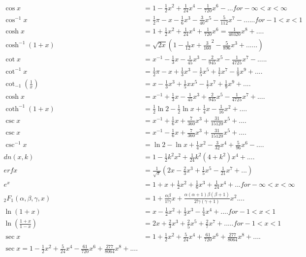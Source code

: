 		\begin{align}
		\cos x &= 1- \frac{1}{2}x^{2}+\frac{1}{24}x^{4}-\frac{1}{720}x^{6} - \ldots for -\infty < x < \infty	\\
		\cos^{-1} x &= \frac{1}{2} \pi - x - \frac{1}{6} x^{3} - \frac{3}{40} x^{5} - \frac{5}{112} x^{7} - ......for - 1 < x < 1\\
		\cosh x &= 1 + \frac{1}{2} x^2  + \frac{1}{24} x^4 + \frac{1}{720} x^6 = \frac{1}{40320} x^8 + ....\\	
		\cosh^{-1} (1+x) &= \sqrt{2x} (1 - \frac{1}{12} x + \frac{3}{160} ^2 - \frac{5}{896} x^3 + ......) \\
		\cot x &= x^{-1} - \frac{1}{3} x - \frac{1}{45} x^3 - \frac{2}{945} x^5 - \frac{1}{4725} x^7 - .....\\
		\cot^{-1} x &= \frac{1}{2} \pi - x + \frac{1}{3} x^3 - \frac{1}{5} x^5 + \frac{1}{7} x^7 - \frac{1}{9} x^9 + ....\\	
		\cot_{-1}(\frac{1}{x}) &= x - \frac{1}{3} x^3 + \frac{1}{5} x x^5 - \frac{1}{7} x^7 + \frac{1}{9} x^9 + ....\\
		\cosh x &= x^{-1} + \frac{1}{3} x - \frac{1}{45} x^3 + \frac{2}{945} x^5 - \frac{1}{4725} x^7 + ....\\
		\coth^{-1}(1+x) &= \frac{1}{2} \ln 2 - \frac{1}{2} \ln x + \frac{1}{4} x - \frac{1}{16} x^2 + ....\\
		\csc x &= x^{-1} + \frac{1}{6} x + \frac{7}{360} x^3 + \frac{31}{15120} x^5 + ....\\
		\csc x &= x^{-1} - \frac{1}{6} x + \frac{7}{360} x^3 + \frac{31}{15120} x^5 + ....\\
		\csc^{-1} x &= \ln 2 - \ln x + \frac{1}{4} x^2 - \frac{3}{32} x^4 + \frac{5}{96} x^6 - ....\\
		dn(x,k) &= 1 - \frac{1}{2} k^2 x^2 + \frac{1}{24} k^2 (4+k^2) x^4 + ....\\
		erf x &= \frac{1}{\sqrt{\pi}} (2x - \frac{2}{3} x^3 + \frac{1}{5} x^5 - \frac{1}{21}x^7 + ...) \\
		e^x &= 1 + x + \frac{1}{2} x^2 + \frac{1}{6} x^3 + \frac{1}{24} x^4 + ... for - \infty < x < \infty \\
		_{2}F_{1} (\alpha,\beta,\gamma,x) &= 1 + \frac{\alpha\beta}{1!\gamma} x + \frac{\alpha(\alpha + 1)\beta(\beta + 1)}{2!\gamma(\gamma + 1)} x^2 ....\\
		\ln(1 + x) &= x - \frac{1}{2} x^2 + \frac{1}{3} x^3 - \frac{1}{4} x^4 + ....for -1 < x < 1 \\
		\ln (\frac{1+x}{1-x}) &= 2x + \frac{2}{3} x^3 + \frac{2}{5} x^5 + \frac{2}{7} x^7 + ..... for -1 < x < 1 \\
		\sec x &= 1 + \frac{1}{2} x^2 + \frac{5}{24} x^4 + \frac{61}{720} x^6 + \frac{277}{8064} x^8 + ....\\
		\sec x = 1 - \frac{1}{2} x^2 + \frac{5}{24} x^4 - \frac{61}{720} x^6 + \frac{277}{8064} x^8 + ....\\
 		\end{align}
